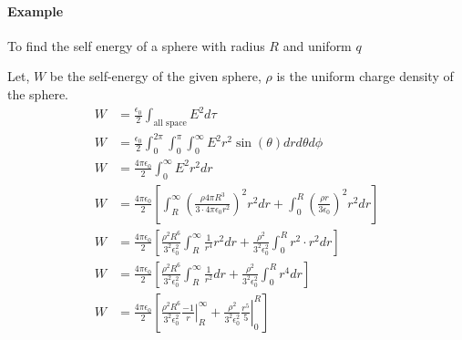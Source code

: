 \documentclass{article}
\begin{document}
\paragraph{Example} To find the self energy of a sphere with radius $R$ and uniform $q$\\
\begin{figure}[H]
	\centering
\end{figure}
Let, $W$ be the self-energy of the given sphere, $\rho$ is the uniform charge density of the sphere.\\
\begin{align*}
	W & = \frac{\epsilon_0}{2} \int_{\text{all space}} E^2 d\tau                                                                                                                                                  \\
	W & = \frac{\epsilon_0}{2} \int_{0}^{2\pi}\int_{0}^{\pi} \int_{0}^{\infty} E^2 r^2 \sin(\theta) dr d\theta d\phi                                                                                              \\
	W & = \frac{4 \pi \epsilon_0}{2} \int_{0}^{\infty} E^2 r^2 dr                                                                                                                                                 \\
	W & = \frac{4 \pi \epsilon_0}{2} \left[ \int_{R}^{\infty} \left( \frac{\rho 4 \pi R^3}{3\cdot 4 \pi \epsilon_0 r^2}\right)^2 r^2 dr + \int_{0}^{R} \left( \frac{\rho r}{3 \epsilon_0}\right)^2 r^2 dr \right] \\
	W & = \frac{4 \pi \epsilon_0}{2} \left[ \frac{\rho ^2 R^6}{3^2 \epsilon_0^2} \int_{R}^{\infty}  \frac{1}{r^4} r^2 dr + \frac{\rho^2}{3^2 \epsilon_0^2} \int_{0}^{R} r^2\cdot r^2 dr \right]                   \\
	W & = \frac{4 \pi \epsilon_0}{2} \left[ \frac{\rho ^2 R^6}{3^2 \epsilon_0^2} \int_{R}^{\infty}  \frac{1}{r^2} dr + \frac{\rho^2}{3^2 \epsilon_0^2} \int_{0}^{R} r^4 dr \right]                                \\
	W & = \frac{4 \pi \epsilon_0}{2} \left[ \frac{\rho ^2 R^6}{3^2 \epsilon_0^2} \left. \frac{-1}{r} \right|_R^{\infty}+ \left. \frac{\rho^2}{3^2 \epsilon_0^2} \frac{r^5}{5} \right|_0^R  \right]                \\

\end{align*}
\end{document}
